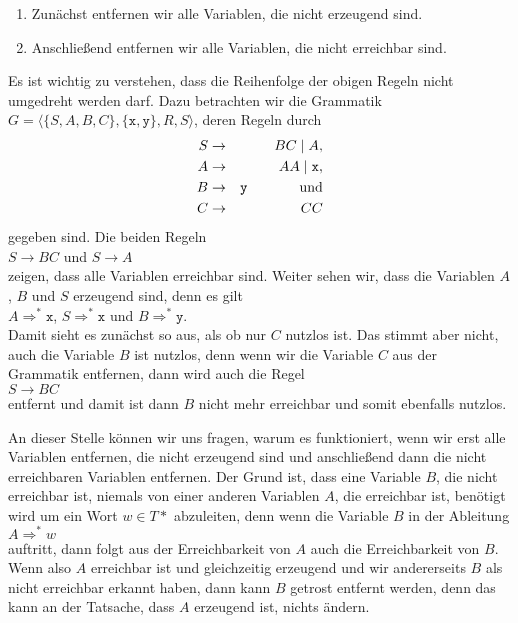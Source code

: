 \begin{enumerate}
\item Zun\"achst entfernen wir alle Variablen, die nicht erzeugend sind.
\item Anschlie{\ss}end entfernen wir alle Variablen, die nicht erreichbar sind.
\end{enumerate}
Es ist wichtig zu verstehen, dass die Reihenfolge der obigen Regeln nicht umgedreht werden darf.
Dazu betrachten wir die Grammatik  $G = \langle \{S, A, B, C\}, \{ \texttt{x}, \texttt{y} \}, R, S \rangle$, deren Regeln durch
\begin{eqnarray*}
  S & \rightarrow & B C \mid A,             \\
  A & \rightarrow & A A \mid \texttt{x},    \\
  B & \rightarrow & \texttt{y} \hspace*{1.3cm} \mbox{und} \\
  C & \rightarrow & C C 
\end{eqnarray*}
gegeben sind.  Die beiden Regeln
\\[0.2cm]
\hspace*{1.3cm}
$S \rightarrow BC$ \quad und \quad $S \rightarrow A$
\\[0.2cm]
zeigen, dass alle Variablen erreichbar sind.  Weiter sehen wir, dass die Variablen $A$, $B$ und $S$
erzeugend sind, denn es gilt
\\[0.2cm]
\hspace*{1.3cm}
$A \Rightarrow^* \texttt{x}$, \quad
$S \Rightarrow^* \texttt{x}$  \quad und \quad
$B \Rightarrow^* \texttt{y}$.
\\[0.2cm]
Damit sieht es zun\"achst so aus, als ob nur $C$ nutzlos ist.  Das stimmt aber nicht, auch die Variable
$B$ ist nutzlos, denn wenn wir die Variable $C$ aus der Grammatik entfernen, dann wird auch die Regel
\\[0.2cm]
\hspace*{1.3cm}
$S \rightarrow BC$
\\[0.2cm]
entfernt und damit ist dann $B$ nicht mehr erreichbar und somit ebenfalls nutzlos.
\pagebreak

\remark
An dieser Stelle k\"onnen wir uns fragen, warum es funktioniert, wenn wir erst alle Variablen 
entfernen, die nicht erzeugend sind und anschlie{\ss}end dann die nicht erreichbaren Variablen entfernen.
Der Grund ist, dass eine Variable $B$, die nicht erreichbar ist, niemals von einer
anderen Variablen $A$, die erreichbar ist, ben\"otigt wird um ein Wort $w\in T*$ abzuleiten, denn
wenn die Variable $B$ in der Ableitung
\\[0.2cm]
\hspace*{1.3cm}
$A \Rightarrow^* w$
\\[0.2cm]
auftritt, dann folgt aus der Erreichbarkeit von $A$ auch die Erreichbarkeit von $B$.
Wenn also $A$ erreichbar ist und gleichzeitig erzeugend und wir andererseits $B$ als
nicht erreichbar erkannt haben, dann kann $B$ getrost entfernt werden, denn das kann 
an der Tatsache, dass $A$ erzeugend ist, nichts \"andern.

